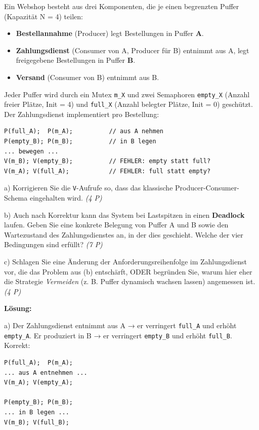 \documentclass[11pt, a4paper]{article}
\begin{document}
Ein Webshop besteht aus drei Komponenten, die je einen begrenzten Puffer (Kapazität N = 4) teilen:


\begin{itemize}
  \item \textbf{Bestellannahme} (Producer) legt Bestellungen in Puffer \textbf{A}.
  \item \textbf{Zahlungsdienst} (Consumer von A, Producer für B) entnimmt aus A, legt freigegebene Bestellungen in Puffer \textbf{B}.
  \item \textbf{Versand} (Consumer von B) entnimmt aus B.
\end{itemize}

Jeder Puffer wird durch ein Mutex \texttt{m\_X} und zwei Semaphoren \texttt{empty\_X} (Anzahl freier Plätze, Init = 4) und \texttt{full\_X} (Anzahl belegter Plätze, Init = 0) geschützt. Der Zahlungsdienst implementiert pro Bestellung:


\begin{lstlisting}
P(full_A);  P(m_A);          // aus A nehmen
P(empty_B); P(m_B);          // in B legen
... bewegen ...
V(m_B); V(empty_B);          // FEHLER: empty statt full?
V(m_A); V(full_A);           // FEHLER: full statt empty?
\end{lstlisting}


a) Korrigieren Sie die \texttt{V}-Aufrufe so, dass das klassische Producer-Consumer-Schema eingehalten wird. \textit{(4 P)}


b) Auch nach Korrektur kann das System bei Lastspitzen in einen \textbf{Deadlock} laufen. Geben Sie eine konkrete Belegung von Puffer A und B sowie den Wartezustand des Zahlungsdienstes an, in der dies geschieht. Welche der vier Bedingungen sind erfüllt? \textit{(7 P)}


c) Schlagen Sie eine Änderung der Anforderungsreihenfolge im Zahlungsdienst vor, die das Problem aus (b) entschärft, ODER begründen Sie, warum hier eher die Strategie \textit{Vermeiden} (z. B. Puffer dynamisch wachsen lassen) angemessen ist. \textit{(4 P)}


\textbf{Lösung:}


a) Der Zahlungsdienst entnimmt aus A → er verringert \texttt{full\_A} und erhöht \texttt{empty\_A}. Er produziert in B → er verringert \texttt{empty\_B} und erhöht \texttt{full\_B}. Korrekt:

\begin{lstlisting}
P(full_A);  P(m_A);
... aus A entnehmen ...
V(m_A); V(empty_A);

P(empty_B); P(m_B);
... in B legen ...
V(m_B); V(full_B);
\end{lstlisting}
\end{document}
